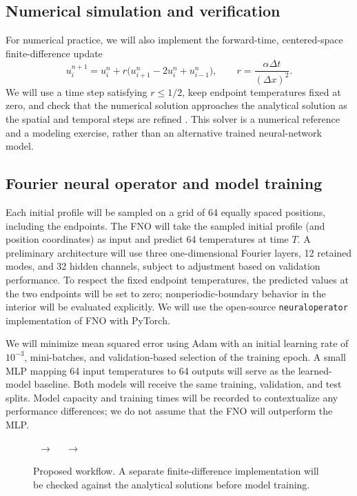 \documentclass{article}
\begin{document}
\subsection{Numerical simulation and verification}
For numerical practice, we will also implement the forward-time, centered-space finite-difference update
\begin{equation}
u_i^{n+1}=u_i^n+r\bigl(u_{i+1}^n-2u_i^n+u_{i-1}^n\bigr),\qquad
r=\frac{\alpha\Delta t}{(\Delta x)^2}.
\label{eq:ftcs}
\end{equation}
We will use a time step satisfying $r\leq 1/2$, keep endpoint temperatures fixed at zero, and check that the numerical solution approaches the analytical solution as the spatial and temporal steps are refined \citep{leveque2007finite}. This solver is a numerical reference and a modeling exercise, rather than an alternative trained neural-network model.

\subsection{Fourier neural operator and model training}
Each initial profile will be sampled on a grid of 64 equally spaced positions, including the endpoints. The FNO will take the sampled initial profile (and position coordinates) as input and predict 64 temperatures at time $T$. A preliminary architecture will use three one-dimensional Fourier layers, 12 retained modes, and 32 hidden channels, subject to adjustment based on validation performance. To respect the fixed endpoint temperatures, the predicted values at the two endpoints will be set to zero; nonperiodic-boundary behavior in the interior will be evaluated explicitly. We will use the open-source \texttt{neuraloperator} implementation of FNO \citep{neuraloperatorsoftware} with PyTorch.

We will minimize mean squared error using Adam with an initial learning rate of $10^{-3}$, mini-batches, and validation-based selection of the training epoch. A small MLP mapping 64 input temperatures to 64 outputs will serve as the learned-model baseline. Both models will receive the same training, validation, and test splits. Model capacity and training times will be recorded to contextualize any performance differences; we do not assume that the FNO will outperform the MLP.

\begin{figure}[t]
\centering
\setlength{\fboxsep}{5pt}
\ $\longrightarrow$\ 
\ $\longrightarrow$\ 
\caption{Proposed workflow. A separate finite-difference implementation will be checked against the analytical solutions before model training.}
\label{fig:workflow}
\end{figure}
\end{document}
